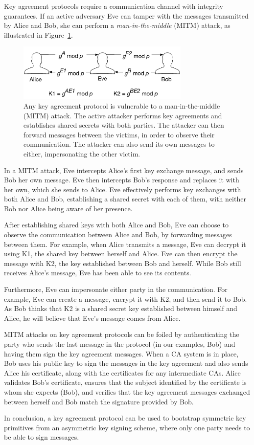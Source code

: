Key agreement protocols require a communication channel with integrity
guarantees. If an active adversary Eve can tamper with the messages transmitted
by Alice and Bob, she can perform a \textit{man-in-the-middle} (MITM) attack,
as illustrated in Figure~\ref{fig:key_agreement_mitm}.

\begin{figure}[hbt]
  \centering
  \includegraphics[width=85mm]{figures/key_agreement_mitm.pdf}
  \caption{
    Any key agreement protocol is vulnerable to a man-in-the-middle (MITM)
    attack. The active attacker performs key agreements and establishes shared
    secrets with both parties. The attacker can then forward messages between
    the victims, in order to observe their communication. The attacker can also
    send its own messages to either, impersonating the other victim.
  }
  \label{fig:key_agreement_mitm}
\end{figure}

In a MITM attack, Eve intercepts Alice's first key exchange message, and sends
Bob her own message. Eve then intercepts Bob's response and replaces it with
her own, which she sends to Alice. Eve effectively performs key exchanges with
both Alice and Bob, establishing a shared secret with each of them, with neither
Bob nor Alice being aware of her presence.

After establishing shared keys with both Alice and Bob, Eve can choose to
observe the communication between Alice and Bob, by forwarding messages between
them. For example, when Alice transmits a message, Eve can decrypt it using K1,
the shared key between herself and Alice. Eve can then encrypt the message with
K2, the key established between Bob and herself. While Bob still receives
Alice's message, Eve has been able to see its contents.

Furthermore, Eve can impersonate either party in the communication. For
example, Eve can create a message, encrypt it with K2, and then send it to Bob.
As Bob thinks that K2 is a shared secret key established between himself and
Alice, he will believe that Eve's message comes from Alice.

MITM attacks on key agreement protocols can be foiled by authenticating the
party who sends the last message in the protocol (in our examples, Bob) and
having them sign the key agreement messages. When a CA system is in place, Bob
uses his public key to sign the messages in the key agreement and also sends
Alice his certificate, along with the certificates for any intermediate CAs.
Alice validates Bob's certificate, ensures that the subject identified by the
certificate is whom she expects (Bob), and verifies that the key agreement
messages exchanged between herself and Bob match the signature provided by Bob.

In conclusion, a key agreement protocol can be used to bootstrap symmetric key
primitives from an asymmetric key signing scheme, where only one party needs to
be able to sign messages.


